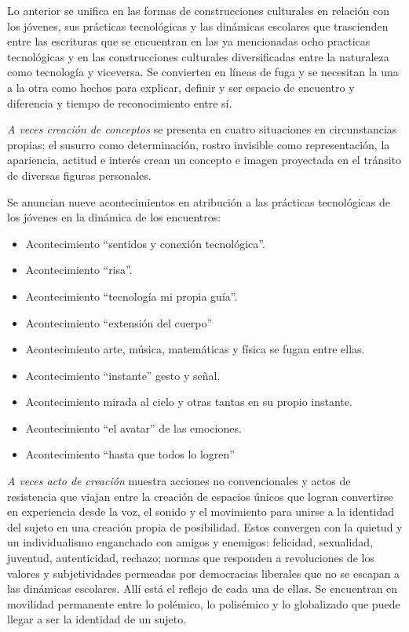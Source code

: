 \documentclass{textolivre}
\begin{document}
Lo anterior se unifica en las formas de construcciones culturales en relación con los jóvenes, sus prácticas tecnológicas y las dinámicas escolares que trascienden entre las escrituras que se encuentran en las ya mencionadas ocho practicas tecnológicas y en las construcciones culturales diversificadas entre la naturaleza como tecnología y viceversa. Se convierten en líneas de fuga y se necesitan la una a la otra como hechos para explicar, definir y ser espacio de encuentro y diferencia y tiempo de reconocimiento entre sí.

\textit{A veces creación de conceptos} se presenta en cuatro situaciones en circunstancias propias; el susurro como determinación, rostro invisible como representación, la apariencia, actitud e interés crean un concepto e imagen proyectada en el tránsito de diversas figuras personales.

Se anuncian nueve acontecimientos en atribución a las prácticas tecnológicas de los jóvenes en la dinámica de los encuentros:

\begin{itemize}
    \item Acontecimiento “sentidos y conexión tecnológica”.
    \item Acontecimiento “risa”.
    \item Acontecimiento “tecnología mi propia guía”.
    \item Acontecimiento “extensión del cuerpo”
    \item Acontecimiento arte, música, matemáticas y física se fugan entre ellas.
    \item Acontecimiento “instante” gesto y señal.	
    \item Acontecimiento mirada al cielo y otras tantas en su propio instante.
    \item Acontecimiento “el avatar” de las emociones.
    \item Acontecimiento “hasta que todos lo logren”
\end{itemize}

\textit{A veces acto de creación} muestra acciones no convencionales y actos de resistencia que viajan entre la creación de espacios únicos que logran convertirse en experiencia desde la voz, el sonido y el movimiento para unirse a la identidad del sujeto en una creación propia de posibilidad. Estos convergen con la quietud y un individualismo enganchado con amigos y enemigos: felicidad, sexualidad, juventud, autenticidad, rechazo; normas que responden a revoluciones de los valores y subjetividades permeadas por democracias liberales que no se escapan a las dinámicas escolares. Allí está el reflejo de cada una de ellas. Se encuentran en movilidad permanente entre lo polémico, lo polisémico y lo globalizado que puede llegar a ser la identidad de un sujeto.
\end{document}
